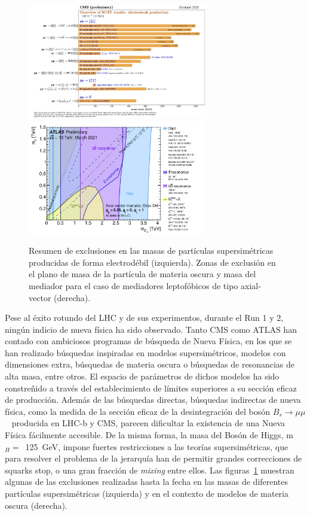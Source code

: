 \begin{figure}[ht]
\centering
\includegraphics[height=5.0cm]{fig/barplot_EWK.png}
\includegraphics[height=5.0cm]{fig/fig_01.png}
\caption{Resumen de exclusiones en las masas de partículas supersimétricas producidas de forma electrodébil (izquierda). Zonas de exclusión en el plano de masa de la partícula de materia oscura y masa del mediador para el caso de mediadores leptofóbicos de tipo axial-vector (derecha).} 
\label{fig:newphysics}
\end{figure} 

Pese al éxito rotundo del LHC y de sus experimentos, durante el Run 1 y 2, ningún indicio de nueva física ha sido observado. Tanto CMS como ATLAS han contado con ambiciosos programas de búsqueda de Nueva Física, en los que se han realizado búsquedas inspiradas en modelos supersimétricos, modelos con dimensiones extra, búsquedas de materia oscura o búsquedas de resonancias de alta masa, entre otros. El espacio de parámetros de dichos modelos ha sido constreñido a través del establecimiento de límites superiores a su sección eficaz de producción. Además de las búsquedas directas, búsquedas indirectas de nueva física, como la medida de la sección eficaz de la desintegración del bosón $B_s\rightarrow\mu\mu$~\cite{bsmumu2,bsmumu1} producida en LHC-b y CMS, parecen dificultar la existencia de una Nueva Física fácilmente accesible. De la misma forma, la masa del Bosón de Higgs, m$_H=$~125~GeV, impone fuertes restricciones a las teorías supersimétricas, que para resolver el problema de la jerarquía han de permitir grandes correcciones de squarks stop, o una gran fracción de \emph{mixing} entre ellos. Las figuras~\ref{fig:newphysics} muestran algunas de las exclusiones realizadas hasta la fecha en las masas de diferentes partículas supersimétricas (izquierda) y en el contexto de modelos de materia oscura (derecha). 

